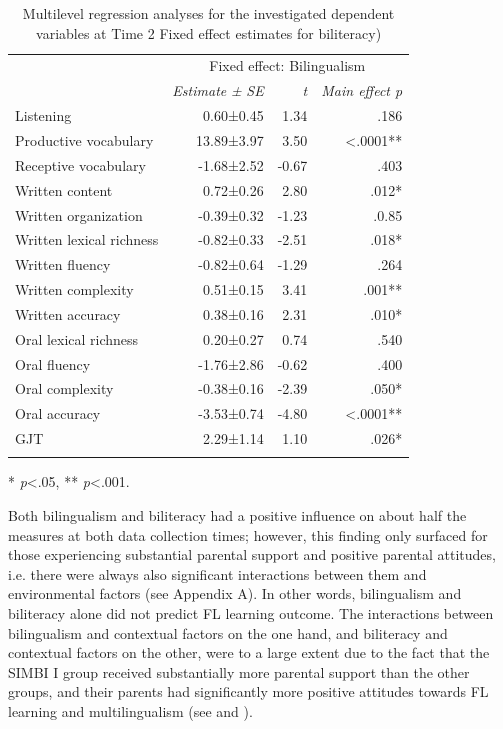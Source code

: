 \documentclass[output=paper,modfonts,nonflat,newtxmath]{langsci/langscibook}
\begin{document}
\begin{table}
	\caption{\label{tab:pfenninger:9} Multilevel regression analyses for the investigated dependent variables at Time 2 Fixed effect estimates for biliteracy)}
	\begin{tabularx}{0.83\textwidth}{l rrr}
		\lsptoprule
		& \multicolumn{3}{c}{ Fixed effect: Bilingualism}\\
		\cmidrule{2-4}
		& \textit{Estimate} \textit{±} \textit{SE} & \textit{t}  & \textit{Main effect p}\\
		\midrule
		Listening  & 0.60±0.45 & 1.34 & .186\\
		Productive vocabulary & 13.89±3.97 & 3.50 & <.0001**\\
		Receptive vocabulary & -1.68±2.52 & -0.67 & .403\\
		Written content & 0.72±0.26 & 2.80 & .012*\\
		Written organization & -0.39±0.32 & -1.23 & .0.85\\
		Written lexical richness & -0.82±0.33 & -2.51 & .018*\\
		Written fluency & -0.82±0.64 & -1.29 & .264\\
		Written complexity & 0.51±0.15 & 3.41 & .001**\\
		Written accuracy & 0.38±0.16 & 2.31 & .010*\\
		Oral lexical richness & 0.20±0.27 & 0.74 & .540\\
		Oral fluency & -1.76±2.86 & -0.62 & .400\\
		Oral complexity & -0.38±0.16 & -2.39 & .050*\\
		Oral accuracy & -3.53±0.74 & -4.80 & <.0001**\\
		GJT & 2.29±1.14 & 1.10 & .026*\\
		\lspbottomrule
	\end{tabularx}
	* \textit{p}<.05, ** \textit{p}<.001.
\end{table}

Both bilingualism and biliteracy had a positive influence on about half the measures at both data collection times; however, this finding only surfaced for those experiencing substantial parental support and positive parental attitudes, i.e. there were always also significant interactions between them and environmental factors (see Appendix A). In other words, bilingualism and biliteracy alone did not predict FL learning outcome. The interactions between bilingualism and contextual factors on the one hand, and biliteracy and contextual factors on the other, were to a large extent due to the fact that the SIMBI I group received substantially more parental support than the other groups, and their parents had significantly more positive attitudes towards FL learning and multilingualism (see  and ).%
\end{document}
